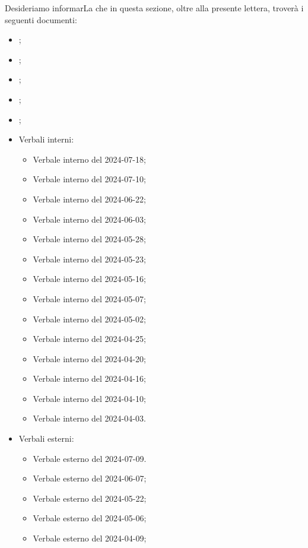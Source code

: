 \par Desideriamo informarLa che in questa sezione, oltre alla presente lettera, troverà i seguenti documenti:
\begin{itemize}
    \item \AnalisiDeiRequisiti;
    \item \Glossario;
    \item \NormeDiProgetto;
    \item \PianoDiProgetto;
    \item \PianoDiQualifica; 
    \item Verbali interni: 
        \begin{itemize}
            \item Verbale interno del 2024-07-18;
            \item Verbale interno del 2024-07-10;
            \item Verbale interno del 2024-06-22;
            \item Verbale interno del 2024-06-03;
            \item Verbale interno del 2024-05-28;
            \item Verbale interno del 2024-05-23;
            \item Verbale interno del 2024-05-16;
            \item Verbale interno del 2024-05-07;
            \item Verbale interno del 2024-05-02;
            \item Verbale interno del 2024-04-25;
            \item Verbale interno del 2024-04-20;
            \item Verbale interno del 2024-04-16;
            \item Verbale interno del 2024-04-10;
            \item Verbale interno del 2024-04-03.
        \end{itemize}
    \item Verbali esterni:
    \begin{itemize}
        \item Verbale esterno del 2024-07-09.
        \item Verbale esterno del 2024-06-07;
        \item Verbale esterno del 2024-05-22;
        \item Verbale esterno del 2024-05-06;
        \item Verbale esterno del 2024-04-09;
    \end{itemize}
\end{itemize}

